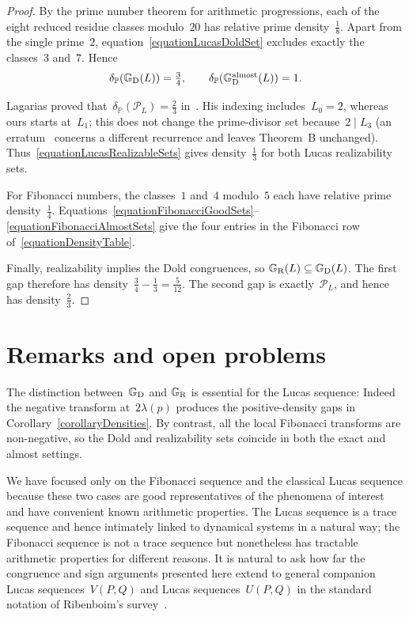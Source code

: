 \documentclass[]{interact}
\theoremstyle{plain}
\numberwithin{equation}{section} %
\numberwithin{table}{section} %
\numberwithin{figure}{section}
\def\PP{\mathbb{P}}
\def\gooddoldprimes{\mathbb{G}_{\rm{D}}}
\def\goodrealizableprimes{\mathbb{G}_{\rm{R}}}
\newcommand\divides\mid
\begin{document}
\begin{proof}
By the prime number theorem for arithmetic progressions,
each of the eight reduced residue classes
modulo~$20$ has relative prime density~$\frac18$. Apart from the single
prime~$2$, equation~\eqref{equationLucasDoldSet} excludes exactly the
classes~$3$ and~$7$. Hence
\[
\delta_{\PP}(\gooddoldprimes(L))=\textstyle\frac34,
\qquad
\delta_{\PP}(\gooddoldprimes^{\text{almost}}(L))=1.
\]

Lagarias proved that~$\delta_{\PP}(\mathcal{P}_L)=\frac23$
in~\cite[Th.~B]{Lagarias1985}. His indexing includes~$L_0=2$, whereas
ours starts at~$L_1$; this does not change the prime-divisor set
because~$2\divides L_3$
(an erratum~\cite{Lagarias1994} concerns a different recurrence and leaves
Theorem~B unchanged). Thus~\eqref{equationLucasRealizableSets}
gives density~$\frac13$ for both Lucas
realizability sets.

For Fibonacci numbers, the classes~$1$ and~$4$ modulo~$5$ each have
relative prime density~$\frac14$.
Equations~\eqref{equationFibonacciGoodSets}--\eqref{equationFibonacciAlmostSets}
give the four entries in the Fibonacci row of~\eqref{equationDensityTable}.

Finally, realizability implies the Dold congruences, so
$\goodrealizableprimes(L)\subseteq\gooddoldprimes(L)$. The first gap
therefore has density~$\frac34-\frac13=\frac{5}{12}$.
The second gap is exactly~$\mathcal{P}_L$, and hence has density~$\frac23$.
\end{proof}

\section{Remarks and open problems}

The distinction between~$\gooddoldprimes$ and
$\goodrealizableprimes$ is essential for the Lucas sequence:
Indeed the negative transform at~$2\lambda(p)$ produces the positive-density
gaps in Corollary~\ref{corollaryDensities}. By contrast, all the local
Fibonacci transforms are non-negative, so the Dold and realizability
sets coincide in both the exact and almost settings.

We have focused only on the Fibonacci sequence and the classical
Lucas sequence because these two cases are good representatives of
the phenomena of interest and have convenient
known arithmetic properties. The Lucas sequence is a trace sequence and hence
intimately linked to dynamical systems in a natural way; the
Fibonacci sequence is not a trace
sequence but nonetheless has tractable arithmetic properties for different
reasons. It is natural to ask how far the congruence and sign
arguments presented here extend to general companion Lucas sequences~$V(P,Q)$ and
Lucas sequences~$U(P,Q)$ in the standard notation of
Ribenboim's survey~\cite{MR1352481}.
\end{document}
